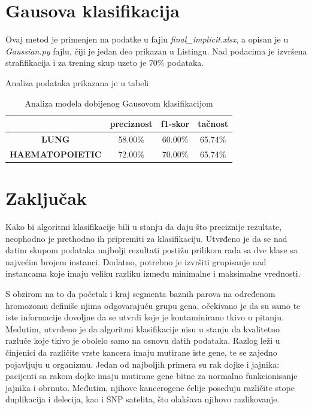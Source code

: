 \documentclass[a4paper]{article}
\begin{document}
\newpage

\section{Gausova klasifikacija}
\label{sec:gaus}

Ovaj metod je primenjen na podatke u fajlu \textit{final\_implicit.xlsx}, a opisan je u \textit{Gaussian.py} fajlu, čiji je jedan deo prikazan u Listingu. Nad podacima je izvršena strafifikacija i za trening skup uzeto je 70\% podataka.

Analiza podataka prikazana je u tabeli
\begin{table}[ht!]
            \begin{center}
            \caption{Analiza modela dobijenog Gausovom klasifikacijom}
            \label{tab:knn}
            \begin{tabular}{c|c|c|c} \hline
            & \textbf{preciznost} & \textbf{f1-skor} & \textbf{tačnost}\\ \hline
            \textbf{LUNG} & 58.00\% & 60.00\% & 65.74\%\\ \hline
            \textbf{HAEMATOPOIETIC} & 72.00\% & 70.00\% & 65.74\%\\ \hline
            \end{tabular}
            \end{center}
        \end{table}



\newpage

\section{Zaključak}
\label{sec:Zakljucak}

Kako bi algoritmi klasifikacije bili u stanju da daju što preciznije rezultate, neophodno je prethodno ih pripremiti za klasifikaciju. Utvrđeno je da se nad datim skupom podataka najbolji rezultati postižu prilikom rada sa dve klase sa najvećim brojem instanci.  Dodatno, potrebno je izvršiti grupisanje nad instancama koje imaju veliku razliku između minimalne i maksimalne vrednosti.

S obzirom na to da početak i kraj segmenta baznih parova na određenom hromozomu definiše njima odgovarajuću grupu gena, očekivano je da su samo te iste informacije dovoljne da se utvrdi koje je kontaminirano tkivo u pitanju. Međutim, utvrđeno je da algoritmi klasifikacije nisu u stanju da kvalitetno razluče koje tkivo je obolelo samo na osnovu datih podataka. Razlog leži u činjenici da različite vrste kancera imaju  mutirane iste gene, te se zajedno pojavljuju u organizmu. Jedan od najboljih primera su rak dojke i jajnika: pacijenti sa rakom dojke imaju mutirane gene bitne za normalno funkcionisanje jajnika i obrnuto. Međutim, njihove kancerogene ćelije poseduju različite stope duplikacija i delecija, kao i SNP satelita, što olakšava njihovo razlikovanje.
\end{document}
